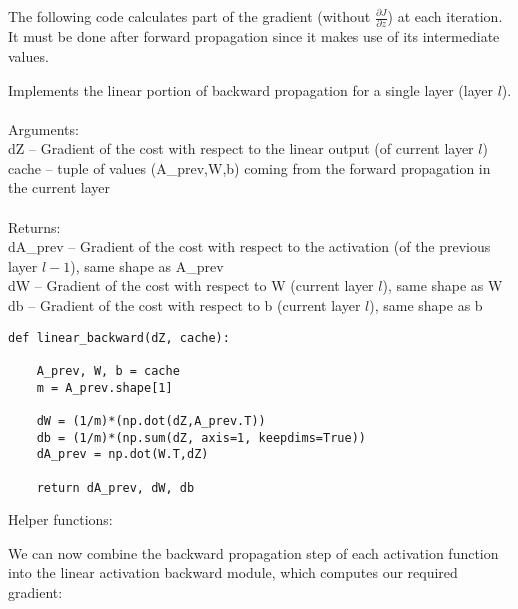 \documentclass[a4paper]{article}
\begin{document}
\begin{enumerate}
The following code calculates part of the gradient (without $\frac{\partial J}{\partial z}$) at each iteration. It must be done after forward propagation since it makes use of its intermediate values. 

\begin{alg}{}{} Implements the linear portion of backward propagation for a single layer (layer $l$). \\~\\
Arguments: \\
dZ -- Gradient of the cost with respect to the linear output (of current layer $l$)\\
cache -- tuple of values (A\_prev,W,b) coming from the forward propagation in the current layer\\~\\
Returns: \\
dA\_prev -- Gradient of the cost with respect to the activation (of the previous layer $l-1$), same shape as A\_prev\\
dW -- Gradient of the cost with respect to W (current layer $l$), same shape as W\\
db -- Gradient of the cost with respect to b (current layer $l$), same shape as b\\
\begin{verbatim}
def linear_backward(dZ, cache):

    A_prev, W, b = cache
    m = A_prev.shape[1]

    dW = (1/m)*(np.dot(dZ,A_prev.T))
    db = (1/m)*(np.sum(dZ, axis=1, keepdims=True))
    dA_prev = np.dot(W.T,dZ)
    
    return dA_prev, dW, db
\end{verbatim}
\end{alg}

Helper functions: 
\begin{alg}{}{}
\end{alg}

We can now combine the backward propagation step of each activation function into the linear activation backward module, which computes our required gradient: 


\end{enumerate}
\end{document}
